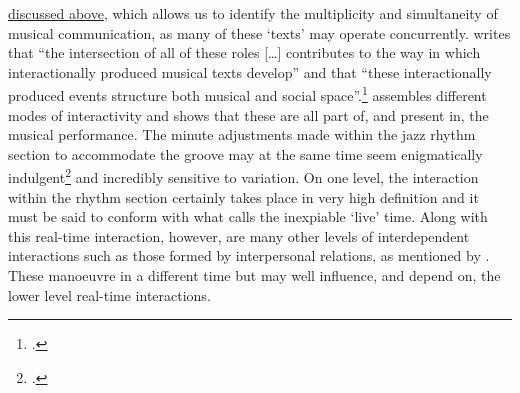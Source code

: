 \hyperlink{sec:inter-defin:monson}{discussed above}, which allows us to identify the multiplicity and simultaneity of musical communication, as many of these `texts' may operate concurrently. \citeauthor{monson96} writes that ``the intersection of all of these roles [\ldots] contributes to the way in which interactionally produced musical texts develop'' and that ``these interactionally produced events structure both musical and social space''.\footcite[189-90]{monson96} \citeauthor{monson96} assembles different modes of interactivity and shows that these are all part of, and present in, the musical performance. The minute adjustments made within the jazz rhythm section to accommodate the groove may at the same time seem enigmatically indulgent\footcite[For a study on the rhythmic variation present in jazz, see][]{friberg02} and incredibly sensitive to variation. On one level, the interaction within the rhythm section certainly takes place in very high definition and it must be said to conform with what \citeauthor{baudrillard02} calls the inexpiable `live' time. Along with this real-time interaction, however, are many other levels of interdependent interactions such as those formed by interpersonal relations, as mentioned by \citeauthor{monson96}. These manoeuvre in a different time but may well influence, and depend on, the lower level real-time interactions.

